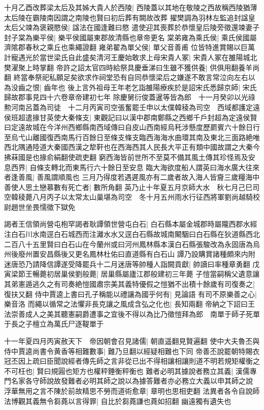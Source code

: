 十月乙酉改葬梁太后及其姊大貴人於西陵|{
	西陵蓋以其地在敬陵之西故稱西陵猶薄太后陵在霸陵南因謂之南陵也賢曰初后葬有闕故改葬}
擢樊調為羽林左監追封諡皇太后父竦為褒親愍侯|{
	諡法在國逢難曰愍}
遣使迎其喪葬於恭懷皇后陵旁徵還竦妻子封子棠為樂平侯|{
	樂平侯國屬東郡故清縣也章帝更名}
棠弟雍為乘氏侯|{
	乘氏侯國屬濟隂郡春秋之乘丘也乘繩證翻}
雍弟翟為單父侯|{
	單父音善甫}
位皆特進賞賜以巨萬計寵遇光於當世梁氏自此盛矣清河王慶始敢求上母宋貴人冢|{
	宋貴人冢在雒陽城北樊濯聚上時掌翻}
帝許之詔太官四時給祭具慶垂涕曰生雖不獲供養|{
	供俱用翻養羊尚翻}
終當奉祭祀私願足矣欲求作祠堂恐有自同恭懷梁后之嫌遂不敢言常泣向左右以為没齒之恨|{
	齒年也}
後上言外祖母王年老乞詣雒陽療疾於是詔宋氏悉歸京師|{
	宋氏歸故郡事見四十六卷章帝建初七年}
除慶舅衍俊蓋暹等皆為郎　十一月癸卯以光祿勲河南呂蓋為司徒　十二月丙寅司空張奮罷壬申以太僕韓稜為司空　西域都護定遠侯班超遣掾甘英使大秦條支|{
	東觀記曰以漢中郡南鄭縣之西鄉千戶封超為定遠侯賢曰定遠故城在今洋州西鄉縣南西域傳曰自皮山西南經烏秅涉懸度歷罽賓六十餘日行至烏弋山離國復西南馬行百餘日至條支條支臨西海海水曲環其南及東北三面路絶唯西北隅通陸道大秦國西漢之犂靬也在西海西其人民長大平正有類中國故謂之大秦今拂菻國是也掾俞絹翻使疏吏翻}
窮西海皆前世所不至莫不備其風土傳其珍怪焉及安息西界|{
	自條支轉北而東馬行六十餘日至安息}
臨大海欲度船人謂英曰海水廣大往來者逢善風|{
	善風謂順風也}
三月乃得度若遇遲風亦有二歲者故入海人皆齎三歲糧海中善使人思土戀慕數有死亡者|{
	數所角翻}
英乃止十年夏五月京師大水　秋七月己巳司空韓稜薨八月丙子以太常太山巢堪為司空　冬十月五州雨水行征西將軍劉尚越騎校尉趙世坐畏懦徵下獄免

謁者王信領尚營屯枹罕謁者耿譚領世營屯白石|{
	白石縣本屬金城郡時屬隴西郡水經注白石川水南逕白石城西而注灕水水又逕白石縣故城南闞駰曰白石縣在狄道縣西北二百八十五里賢曰白石山在今蘭州或曰河州鳳林縣本漢白石縣張駿改為永固唐為烏州後廢州置安昌縣後又更名鳳林杜佑曰直道縣有白石山}
譚乃設購賞諸種頗來内附迷唐恐乃請降信譚遂受降罷兵十二月迷唐等帥種人詣闕貢獻|{
	帥讀曰率種章勇翻}
戊寅梁節王暢薨初居巢侯劉般薨|{
	居巢縣屬廬江郡般建初三年薨}
子愷當嗣稱父遺意讓其弟憲遁逃久之有司奏絶愷國肅宗美其義特優假之愷猶不出積十餘歲有司復奏之|{
	復扶又翻}
侍中賈逵上書曰孔子稱能以禮讓為國乎何有|{
	見論語}
有司不原樂善之心|{
	樂音洛}
而繩以循常之法懼非長克讓之風成含弘之化也|{
	長知兩翻}
帝納之下詔曰王法崇善成人之美其聽憲嗣爵遭事之宜後不得以為比乃徵愷拜為郎　南單于師子死單于長之子檀立為萬氏尸逐鞮單于

十一年夏四月丙寅赦天下　帝因朝會召見諸儒|{
	朝直遥翻見賢遍翻}
使中大夫魯丕與侍中賈逵尚書令黄香等相難數事|{
	難乃旦翻以經疑相難也下同}
帝善丕說罷朝特賜衣冠丕因上疏曰臣聞說經者傳先師之言非從已出不得相讓相讓則道不明若規矩權衡之不可枉也|{
	賢曰規圓也矩方也權秤錘衡秤衡也}
難者必明其據說者務立其義|{
	漢儒專門名家各守師說故發難者必明其師之說以為據答難者亦必務立大義以申其師之說}
浮華無用之言不陳於前故精思不勞而道術愈章|{
	章明也思相吏翻}
法異者各令自說師法博觀其義無令芻蕘以言得罪|{
	自比於芻蕘謙也蕘如招翻}
幽遠獨有遺失也

